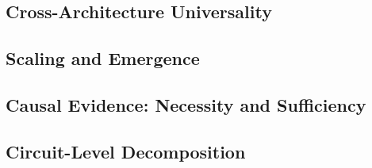 \documentclass{article}
\begin{document}



\subsection{Cross-Architecture Universality}




\subsection{Scaling and Emergence}




\subsection{Causal Evidence: Necessity and Sufficiency}



\subsection{Circuit-Level Decomposition}

\end{document}

